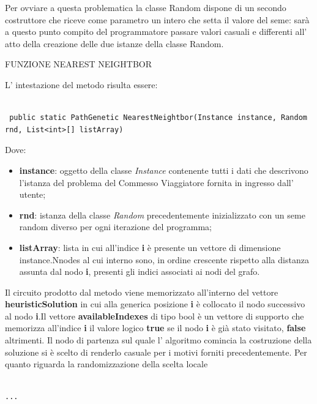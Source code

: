\documentclass[11pt]{article}
\begin{document}
Per ovviare a questa problematica la classe Random dispone di un secondo costruttore che riceve come parametro un intero che setta il valore del seme: sarà a questo punto compito del programmatore passare valori casuali e  differenti all' atto della creazione delle due istanze della classe Random.

\vspace{2\baselineskip}
FUNZIONE NEAREST NEIGHTBOR
\vspace{2\baselineskip}

L' intestazione del metodo risulta essere:

\begin{lstlisting}

 public static PathGenetic NearestNeightbor(Instance instance, Random rnd, List<int>[] listArray)

\end{lstlisting}


Dove:

\begin{itemize}
    \item \textbf{instance}: oggetto della classe \textit{Instance} contenente tutti i dati che descrivono l'istanza del problema del Commesso Viaggiatore fornita in ingresso dall' utente;
    \item \textbf{rnd}: istanza della classe \textit{Random} precedentemente inizializzato con un seme random diverso per ogni iterazione del programma;
    \item \textbf{listArray}: lista in cui all'indice \textbf{i} è presente un vettore di dimensione instance.Nnodes al cui interno sono, in ordine crescente rispetto alla distanza assunta dal nodo \textbf{i}, presenti gli indici associati ai nodi del grafo.
\end{itemize}

Il circuito prodotto dal metodo viene memorizzato all'interno del vettore \textbf{heuristicSolution} in cui alla generica posizione \textbf{i} è collocato il nodo successivo al nodo \textbf{i}.Il vettore \textbf{availableIndexes} di tipo bool è un vettore di supporto che memorizza all'indice \textbf{i} il valore logico \textbf{true} se il nodo \textbf{i} è già stato visitato, \textbf{false} altrimenti. Il nodo di partenza sul quale l' algoritmo comincia la costruzione della soluzione si è scelto di renderlo casuale per i motivi forniti precedentemente. Per quanto riguarda la randomizzazione della scelta locale
\begin{lstlisting}

...

\end{lstlisting}
\end{document}

